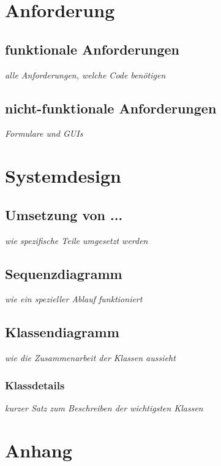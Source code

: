 \documentclass[a4paper, 10pt, fleqn]{article}
\begin{document}
	\section{Anforderung}
		\subsection{funktionale Anforderungen}
			\textit{alle Anforderungen, welche Code benötigen}
		\subsection{nicht-funktionale Anforderungen}
			\textit{Formulare und GUIs}
	\section{Systemdesign}
		\subsection{Umsetzung von ...}
			\textit{wie spezifische Teile umgesetzt werden}
		\subsection{Sequenzdiagramm}
			\textit{wie ein spezieller Ablauf funktioniert}
		\subsection{Klassendiagramm}
			\textit{wie die Zusammenarbeit der Klassen aussieht}
			\subsubsection{Klassdetails}
				\textit{kurzer Satz zum Beschreiben der wichtigsten Klassen}

\clearpage
\thispagestyle{empty}
	\section*{Anhang}
\end{document}
